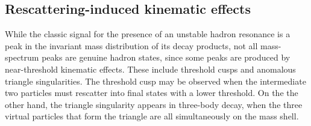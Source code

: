 \subsection{Rescattering-induced kinematic effects}


While the classic signal for the presence of an unstable hadron resonance is a peak in the invariant mass distribution of its decay products, 
not all mass-spectrum peaks are genuine hadron states,
since some peaks are produced by near-threshold kinematic effects.
These include threshold cusps and anomalous triangle singularities\supercite{RevModPhys.90.015003}.
The threshold cusp may be observed when  the intermediate two particles must rescatter into final states with a lower threshold.
On the the other hand,
the triangle singularity appears in three-body decay,
when the three virtual particles that form the triangle are all simultaneously on the mass shell\supercite{GUO2020103757}.












